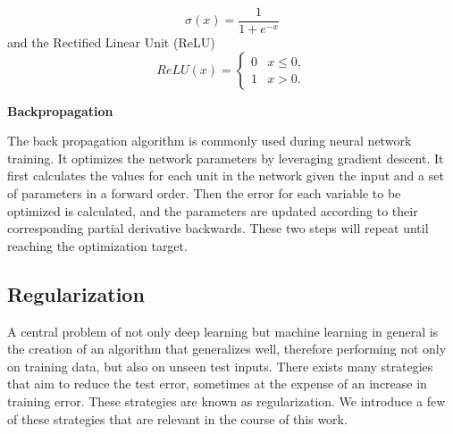 \begin{equation}
    \sigma (x)= \frac{1}{1+e^{-x}}
\end{equation}
and the Rectified Linear Unit (ReLU)
\begin{equation}
    ReLU(x)=\begin{cases}
        0 & x \leq 0, \\
        1 & x > 0.
    \end{cases}
\end{equation}

\textbf{Backpropagation}

The back propagation algorithm is commonly used during neural network training. It optimizes the network parameters by leveraging gradient descent. It first calculates the values for each unit in the network given the input and a set of parameters in a forward order. Then the error for each variable to be optimized is calculated, and the parameters are updated according to their corresponding partial derivative backwards. These two steps will repeat until reaching the optimization target.

\subsection{Regularization}
A central problem of not only deep learning but machine learning in general is the creation of an algorithm that generalizes well, therefore performing not only on training data, but also on unseen test inputs. There exists many strategies that aim to reduce the test error, sometimes at the expense of an increase in training error. These strategies are known as regularization. We introduce a few of these strategies that are relevant in the course of this work.

